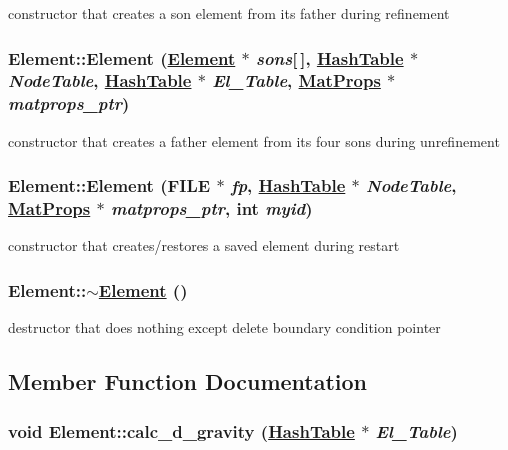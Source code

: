 constructor that creates a son element from its father during refinement 

\hypertarget{classElement_a3}{
\subsubsection[Element]{\setlength{\rightskip}{0pt plus 5cm}Element::Element (\hyperlink{classElement}{Element} $\ast$ {\em sons}\mbox{[}$\,$\mbox{]}, \hyperlink{classHashTable}{Hash\-Table} $\ast$ {\em Node\-Table}, \hyperlink{classHashTable}{Hash\-Table} $\ast$ {\em El\_\-Table}, \hyperlink{structMatProps}{Mat\-Props} $\ast$ {\em matprops\_\-ptr})}}
\label{classElement_a3}


constructor that creates a father element from its four sons during unrefinement 

\hypertarget{classElement_a4}{
\subsubsection[Element]{\setlength{\rightskip}{0pt plus 5cm}Element::Element (FILE $\ast$ {\em fp}, \hyperlink{classHashTable}{Hash\-Table} $\ast$ {\em Node\-Table}, \hyperlink{structMatProps}{Mat\-Props} $\ast$ {\em matprops\_\-ptr}, int {\em myid})}}
\label{classElement_a4}


constructor that creates/restores a saved element during restart 

\hypertarget{classElement_a5}{
\subsubsection[$\sim$Element]{\setlength{\rightskip}{0pt plus 5cm}Element::$\sim$\hyperlink{classElement}{Element} ()}}
\label{classElement_a5}


destructor that does nothing except delete boundary condition pointer 



\subsection{Member Function Documentation}
\hypertarget{classElement_a96}{
\subsubsection[calc\_\-d\_\-gravity]{\setlength{\rightskip}{0pt plus 5cm}void Element::calc\_\-d\_\-gravity (\hyperlink{classHashTable}{Hash\-Table} $\ast$ {\em El\_\-Table})}}
\label{classElement_a96}


